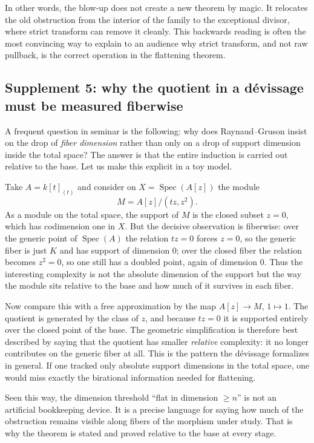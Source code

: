 \documentclass[11pt,oneside]{article}
\newcommand{\Spec}{\operatorname{Spec}}
\begin{document}
In other words, the blow-up does not create a new theorem by magic.  It relocates the old obstruction from the interior of the family to the exceptional divisor, where strict transform can remove it cleanly.  This backwards reading is often the most convincing way to explain to an audience why strict transform, and not raw pullback, is the correct operation in the flattening theorem.

\subsection*{Supplement 5: why the quotient in a d\'evissage must be measured fiberwise}

A frequent question in seminar is the following: why does Raynaud--Gruson insist on the drop of \emph{fiber dimension} rather than only on a drop of support dimension inside the total space?  The answer is that the entire induction is carried out relative to the base.  Let us make this explicit in a toy model.

Take $A=k[t]_{(t)}$ and consider on $X=\Spec(A[z])$ the module
\[
M=A[z]/(tz,z^2).
\]
As a module on the total space, the support of $M$ is the closed subset $z=0$, which has codimension one in $X$.  But the decisive observation is fiberwise: over the generic point of $\Spec(A)$ the relation $tz=0$ forces $z=0$, so the generic fiber is just $K$ and has support of dimension $0$; over the closed fiber the relation becomes $z^2=0$, so one still has a doubled point, again of dimension $0$.  Thus the interesting complexity is not the absolute dimension of the support but the way the module sits relative to the base and how much of it survives in each fiber.

Now compare this with a free approximation by the map $A[z]\to M$, $1\mapsto 1$.  The quotient is generated by the class of $z$, and because $tz=0$ it is supported entirely over the closed point of the base.  The geometric simplification is therefore best described by saying that the quotient has smaller \emph{relative} complexity: it no longer contributes on the generic fiber at all.  This is the pattern the d\'evissage formalizes in general.  If one tracked only absolute support dimensions in the total space, one would miss exactly the birational information needed for flattening.

Seen this way, the dimension threshold ``flat in dimension $\ge n$'' is not an artificial bookkeeping device.  It is a precise language for saying how much of the obstruction remains visible along fibers of the morphism under study.  That is why the theorem is stated and proved relative to the base at every stage.
\end{document}
